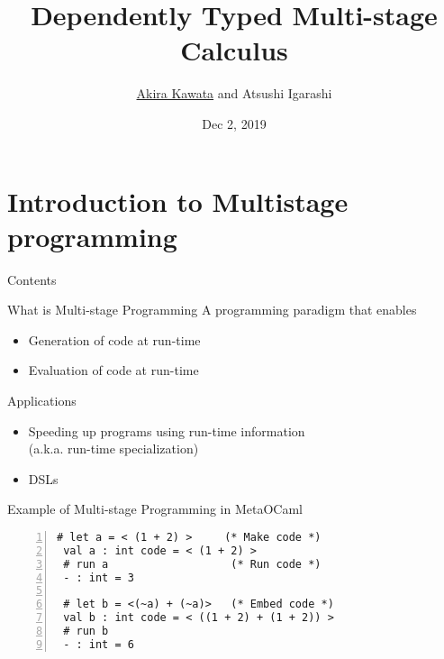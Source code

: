 \documentclass[dvipdfmx,aspectratio=169, 20pt]{beamer}
\title{Dependently Typed Multi-stage Calculus}
\author{\underline{Akira Kawata} and Atsushi Igarashi}
\institute{Graduate School of Informatics, Kyoto University}
\date{Dec 2, 2019}
\begin{document}
\maketitle


\section{Introduction to Multistage programming}

\begin{frame}{Contents}


    \tableofcontents
    \note{
    }
\end{frame}

\begin{frame}[fragile]{What is Multi-stage Programming}
    A programming paradigm that enables
    \begin{itemize}
        \item Generation of code at run-time
        \item Evaluation of code at run-time
    \end{itemize}
    Applications
    \begin{itemize}
        \item Speeding up programs using run-time information \\
            (a.k.a. run-time specialization)
        \item DSLs
    \end{itemize}
\end{frame}

\begin{frame}[fragile]{Example of Multi-stage Programming in MetaOCaml}
    \begin{exampleblock}{}
        \begin{Verbatim}[numbers=left]
 # let a = < (1 + 2) >     (* Make code *)
 val a : int code = < (1 + 2) >
 # run a                   (* Run code *)
 - : int = 3

 # let b = <(~a) + (~a)>   (* Embed code *)
 val b : int code = < ((1 + 2) + (1 + 2)) >
 # run b
 - : int = 6
        \end{Verbatim}
    \end{exampleblock}
    \note{
    }
\end{frame}
\end{document}
